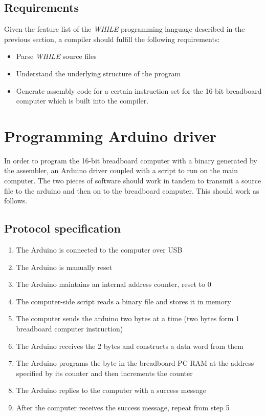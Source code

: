 \subsection{Requirements}
Given the feature list of the \emph{WHILE} programming language described in the previous
section, a compiler should fulfill the following requirements:

\begin{itemize}
  \item Parse \emph{WHILE} source files
  \item Understand the underlying structure of the program
  \item Generate assembly code for a certain instruction set for the 16-bit breadboard computer
  which is built into the compiler.
\end{itemize}

\section{Programming Arduino driver}
In order to program the 16-bit breadboard computer with a binary generated by the assembler,
an Arduino driver coupled with a script to run on the main computer. The two pieces of software
should work in tandem to transmit a source file to the arduino and then on to the breadboard
computer. This should work as follows.

\subsection{Protocol specification}
\begin{enumerate}
  \item The Arduino is connected to the computer over USB
  \item The Arduino is manually reset
  \item The Arduino maintains an internal address counter, reset to 0
  \item The computer-side script reads a binary file and stores it in memory
  \item The computer sends the arduino two bytes at a time (two bytes form 1 breadboard
  computer instruction)
  \item The Arduino receives the 2 bytes and constructs a data word from them
  \item The Arduino programs the byte in the breadboard PC RAM at the address specified by its
  counter and then increments the counter
  \item The Arduino replies to the computer with a success message
  \item After the computer receives the success message, repeat from step 5
\end{enumerate}


